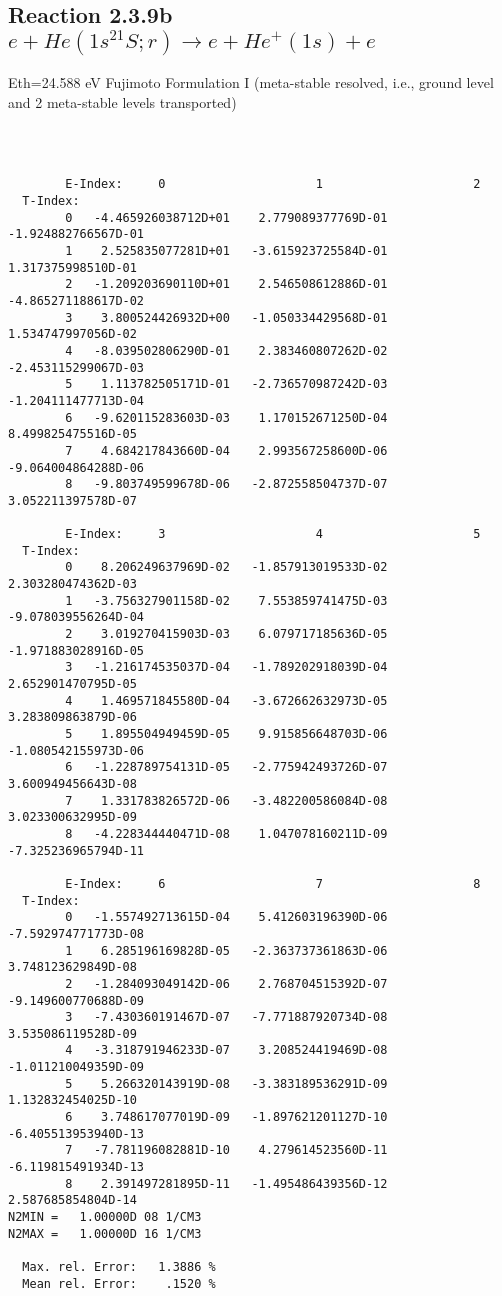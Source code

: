 \documentclass[12pt,dvipdfmx]{article}
\begin{document}
\subsection{
Reaction 2.3.9b  $e + He(1s^21S;r) \rightarrow e + He^+(1s) + e  $
}
Eth=24.588 eV
 Fujimoto Formulation I (meta-stable resolved, i.e., ground level and 2 meta-stable levels transported) \cite{kn:Fujimoto}

\begin{small}\begin{verbatim}



        E-Index:     0                     1                     2
  T-Index:
        0   -4.465926038712D+01    2.779089377769D-01   -1.924882766567D-01
        1    2.525835077281D+01   -3.615923725584D-01    1.317375998510D-01
        2   -1.209203690110D+01    2.546508612886D-01   -4.865271188617D-02
        3    3.800524426932D+00   -1.050334429568D-01    1.534747997056D-02
        4   -8.039502806290D-01    2.383460807262D-02   -2.453115299067D-03
        5    1.113782505171D-01   -2.736570987242D-03   -1.204111477713D-04
        6   -9.620115283603D-03    1.170152671250D-04    8.499825475516D-05
        7    4.684217843660D-04    2.993567258600D-06   -9.064004864288D-06
        8   -9.803749599678D-06   -2.872558504737D-07    3.052211397578D-07

        E-Index:     3                     4                     5
  T-Index:
        0    8.206249637969D-02   -1.857913019533D-02    2.303280474362D-03
        1   -3.756327901158D-02    7.553859741475D-03   -9.078039556264D-04
        2    3.019270415903D-03    6.079717185636D-05   -1.971883028916D-05
        3   -1.216174535037D-04   -1.789202918039D-04    2.652901470795D-05
        4    1.469571845580D-04   -3.672662632973D-05    3.283809863879D-06
        5    1.895504949459D-05    9.915856648703D-06   -1.080542155973D-06
        6   -1.228789754131D-05   -2.775942493726D-07    3.600949456643D-08
        7    1.331783826572D-06   -3.482200586084D-08    3.023300632995D-09
        8   -4.228344440471D-08    1.047078160211D-09   -7.325236965794D-11

        E-Index:     6                     7                     8
  T-Index:
        0   -1.557492713615D-04    5.412603196390D-06   -7.592974771773D-08
        1    6.285196169828D-05   -2.363737361863D-06    3.748123629849D-08
        2   -1.284093049142D-06    2.768704515392D-07   -9.149600770688D-09
        3   -7.430360191467D-07   -7.771887920734D-08    3.535086119528D-09
        4   -3.318791946233D-07    3.208524419469D-08   -1.011210049359D-09
        5    5.266320143919D-08   -3.383189536291D-09    1.132832454025D-10
        6    3.748617077019D-09   -1.897621201127D-10   -6.405513953940D-13
        7   -7.781196082881D-10    4.279614523560D-11   -6.119815491934D-13
        8    2.391497281895D-11   -1.495486439356D-12    2.587685854804D-14
N2MIN =   1.00000D 08 1/CM3
N2MAX =   1.00000D 16 1/CM3

  Max. rel. Error:   1.3886 %
  Mean rel. Error:    .1520 %

\end{verbatim}\end{small}
\end{document}
